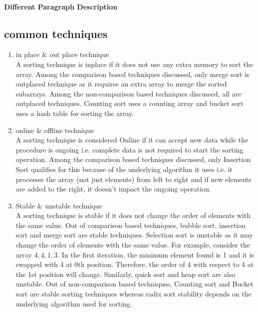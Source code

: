\documentclass[
10pt, %
a4paper, %
oneside, %
headinclude,footinclude, %
BCOR5mm, %
]{scrartcl}
\begin{document}
\paragraph{Different Paragraph Description}  


\subsection{common techniques}
\begin{enumerate}[noitemsep]
\item in place \& out place technique
\\
A sorting technique is inplace if it does not use any extra memory to sort the array. 
Among the comparison based techniques discussed, only merge sort is outplaced technique as it requires an extra array to merge the sorted subarrays. 
Among the non-comparison based techniques discussed, all are outplaced techniques. Counting sort uses a counting array and bucket sort uses a hash table for sorting the array. 

\item online \& offline technique
\\
A sorting technique is considered Online if it can accept new data while the procedure is ongoing i.e. complete data is not required to start the sorting operation. 
Among the comparison based techniques discussed, only Insertion Sort qualifies for this because of the underlying algorithm it uses i.e. it processes the array (not just elements) from left to right and if new elements are added to the right, it doesn’t impact the ongoing operation. 

\item Stable \& unstable technique
\\
A sorting technique is stable if it does not change the order of elements with the same value. 
Out of comparison based techniques, bubble sort, insertion sort and merge sort are stable techniques. Selection sort is unstable as it may change the order of elements with the same value. For example, consider the array $4, 4, 1, 3.$ 
In the first iteration, the minimum element found is 1 and it is swapped with 4 at 0th position. Therefore, the order of 4 with respect to 4 at the 1st position will change. Similarly, quick sort and heap sort are also unstable. 
Out of non-comparison based techniques, Counting sort and Bucket sort are stable sorting techniques whereas radix sort stability depends on the underlying algorithm used for sorting. 
\end{enumerate}
\end{document}
